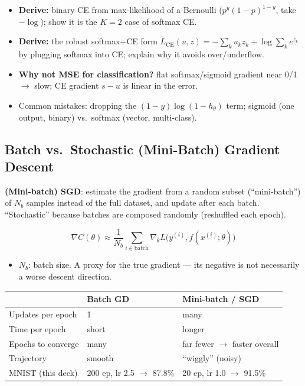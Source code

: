 \documentclass[10pt,a4paper]{article}
\begin{document}
	\begin{examtipbox}
		\begin{itemize}[leftmargin=*]
			\item \textbf{Derive:} binary CE from max-likelihood of a Bernoulli ($p^y(1-p)^{1-y}$, take $-\log$); show it is the $K{=}2$ case of softmax CE.
			\item \textbf{Derive:} the robust softmax+CE form $\tilde L_{\mathrm{CE}}(u,z)=-\sum_k u_k z_k+\log\sum_k e^{z_k}$ by plugging softmax into CE; explain why it avoids over/underflow.
			\item \textbf{Why not MSE for classification?} flat softmax/sigmoid gradient near 0/1 $\rightarrow$ slow; CE gradient $s-u$ is linear in the error.
			\item Common mistakes: dropping the $(1-y)\log(1-h_\theta)$ term; sigmoid (one output, binary) vs.\ softmax (vector, multi-class).
		\end{itemize}
	\end{examtipbox}

	\subsection{Batch vs.\ Stochastic (Mini-Batch) Gradient Descent}

	\begin{definitionbox}
		\textbf{(Mini-batch) SGD}: estimate the gradient from a random subset (``mini-batch'') of $N_b$ samples instead of the full dataset, and update after each batch. ``Stochastic'' because batches are composed randomly (reshuffled each epoch).
	\end{definitionbox}

	\begin{formulabox}
		\[
		\nabla C(\theta) \approx \frac{1}{N_b}\sum_{i\in\text{batch}} \nabla_\theta L\big(y^{(i)}, f(x^{(i)};\theta)\big)
		\]
	\end{formulabox}
	\begin{itemize}[leftmargin=*]
		\item $N_b$: batch size. A proxy for the true gradient --- its negative is not necessarily a worse descent direction.
	\end{itemize}

	\begin{center}
		\begin{tabular}{p{4.2cm} p{5.3cm} p{5.3cm}}
			\toprule
			& \textbf{Batch GD} & \textbf{Mini-batch / SGD} \\
			\midrule
			Updates per epoch  & 1 & many \\
			Time per epoch     & short & longer \\
			Epochs to converge & many & far fewer $\rightarrow$ faster overall \\
			Trajectory         & smooth & ``wiggly'' (noisy) \\
			MNIST (this deck)  & 200 ep, lr 2.5 $\to$ 87.8\% & 20 ep, lr 1.0 $\to$ 91.5\% \\
			\bottomrule
		\end{tabular}
	\end{center}
\end{document}
